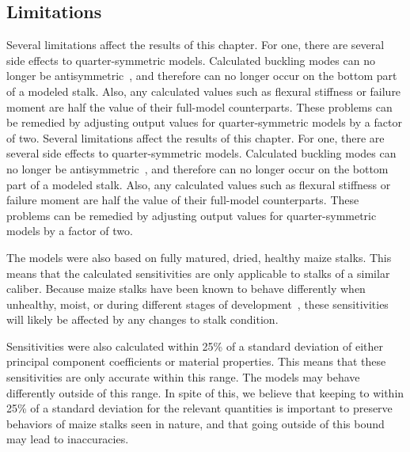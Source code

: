 \subsection{Limitations}
\label{ssec:limitations}
Several limitations affect the results of this chapter. For one, there are several side effects to quarter-symmetric models. Calculated buckling modes can no longer be antisymmetric~, and therefore can no longer occur on the bottom part of a modeled stalk. Also, any calculated values such as flexural stiffness or failure moment are half the value of their full-model counterparts. These problems can be remedied by adjusting output values for quarter-symmetric models by a factor of two.
Several limitations affect the results of this chapter. For one, there are several side effects to quarter-symmetric models. Calculated buckling modes can no longer be antisymmetric~, and therefore can no longer occur on the bottom part of a modeled stalk. Also, any calculated values such as flexural stiffness or failure moment are half the value of their full-model counterparts. These problems can be remedied by adjusting output values for quarter-symmetric models by a factor of two.

The models were also based on fully matured, dried, healthy maize stalks. This means that the calculated sensitivities are only applicable to stalks of a similar caliber. Because maize stalks have been known to behave differently when unhealthy, moist, or during different stages of development~, these sensitivities will likely be affected by any changes to stalk condition.

Sensitivities were also calculated within 25\% of a standard deviation of either principal component coefficients or material properties. This means that these sensitivities are only accurate within this range. The models may behave differently outside of this range. In spite of this, we believe that keeping to within 25\% of a standard deviation for the relevant quantities is important to preserve behaviors of maize stalks seen in nature, and that going outside of this bound may lead to inaccuracies. 


